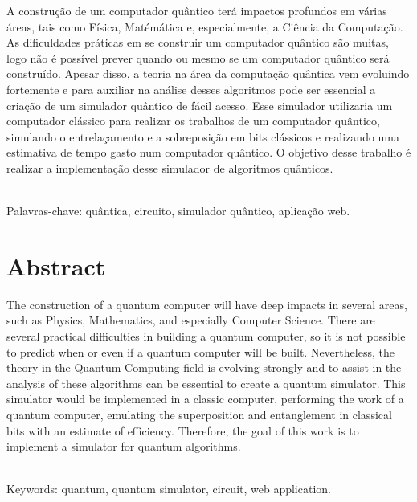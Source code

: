 \documentclass[a4paper, 12pt, oneside]{book}
\begin{document}
\thispagestyle{myheadings}

A construção de um computador quântico terá impactos profundos em várias áreas, tais como Física, Matémática e, especialmente, a Ciência da Computação. As dificuldades práticas em se construir um computador quântico são muitas, logo não é possível prever quando ou mesmo se um computador quântico será construído. Apesar disso, a teoria na área da computação quântica vem evoluindo fortemente e para auxiliar na análise desses algoritmos pode ser essencial a criação de um simulador quântico de fácil acesso. Esse simulador utilizaria um computador clássico para realizar os trabalhos de um computador quântico, simulando o entrelaçamento e a sobreposição em bits clássicos e realizando uma estimativa de tempo gasto num computador quântico. O objetivo desse trabalho é realizar a implementação desse simulador de algoritmos quânticos.

\ \\

Palavras-chave: quântica, circuito, simulador quântico, aplicação web. 


\chapter*{Abstract}

\thispagestyle{myheadings}

The construction of a quantum computer will have deep impacts in several areas, such as Physics, Mathematics, and especially Computer Science. There are several practical difficulties in building a quantum computer, so it is not possible to predict when or even if a quantum computer will be built. Nevertheless, the theory in the Quantum Computing field is evolving strongly and to assist in the analysis of these algorithms can be essential to create a quantum simulator. This simulator would be implemented in a classic computer, performing the work of a quantum computer, emulating the superposition and entanglement in classical bits with an estimate of efficiency. Therefore, the goal of this work is to implement a simulator for quantum algorithms.

\ \\

Keywords: quantum, quantum simulator, circuit, web application.

\end{document}
